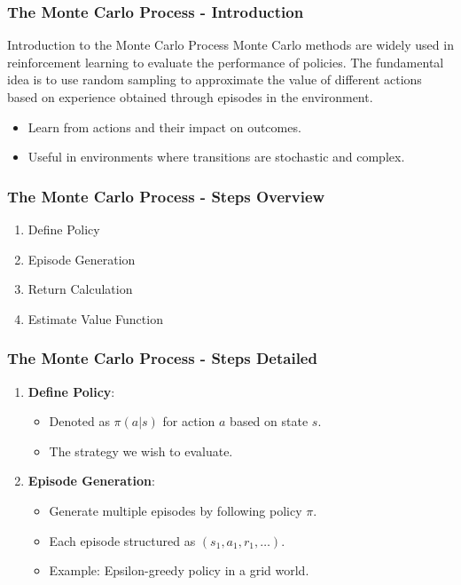 \documentclass[aspectratio=169]{beamer}
\begin{document}
\begin{frame}[fragile]
    \frametitle{The Monte Carlo Process - Introduction}
    \begin{block}{Introduction to the Monte Carlo Process}
        Monte Carlo methods are widely used in reinforcement learning to evaluate the performance of policies. The fundamental idea is to use random sampling to approximate the value of different actions based on experience obtained through episodes in the environment.
    \end{block}
    
    \begin{itemize}
        \item Learn from actions and their impact on outcomes.
        \item Useful in environments where transitions are stochastic and complex.
    \end{itemize}
\end{frame}

\begin{frame}[fragile]
    \frametitle{The Monte Carlo Process - Steps Overview}
    \begin{enumerate}
        \item Define Policy
        \item Episode Generation
        \item Return Calculation
        \item Estimate Value Function
    \end{enumerate}
\end{frame}

\begin{frame}[fragile]
    \frametitle{The Monte Carlo Process - Steps Detailed}
    \begin{enumerate}
        \item \textbf{Define Policy}:
        \begin{itemize}
            \item Denoted as \( \pi(a|s) \) for action \( a \) based on state \( s \).
            \item The strategy we wish to evaluate.
        \end{itemize}

        \item \textbf{Episode Generation}:
        \begin{itemize}
            \item Generate multiple episodes by following policy \( \pi \).
            \item Each episode structured as \( (s_1, a_1, r_1, \ldots) \).
            \item Example: Epsilon-greedy policy in a grid world.
        \end{itemize}
    \end{enumerate}
\end{frame}
\end{document}
